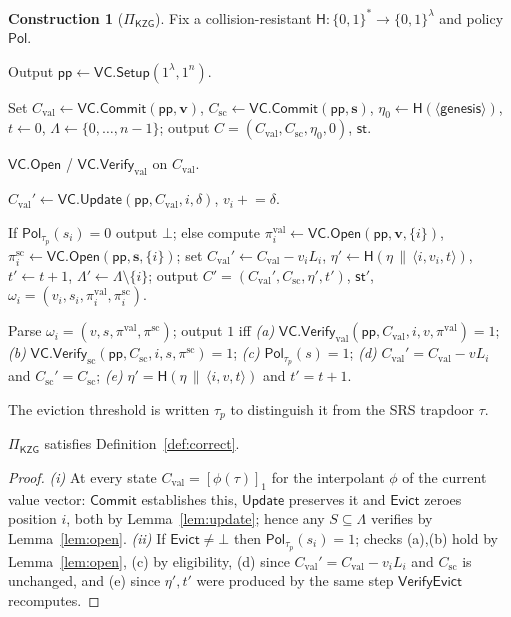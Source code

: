 \documentclass[version=submission]{iacrcc}
\theoremstyle{definition}
\newtheorem{construction}{Construction}[section]
\newcommand{\secpar}{\lambda}
\newcommand{\bit}{\{0,1\}}
\newcommand{\concat}{\,\|\,}
\newcommand{\Setup}{\mathsf{Setup}}
\newcommand{\Commit}{\mathsf{Commit}}
\newcommand{\Open}{\mathsf{Open}}
\newcommand{\Vfy}{\mathsf{Verify}}
\newcommand{\Update}{\mathsf{Update}}
\newcommand{\Evict}{\mathsf{Evict}}
\newcommand{\VfyEvict}{\mathsf{VerifyEvict}}
\newcommand{\pp}{\mathsf{pp}}
\newcommand{\aux}{\mathsf{st}}
\newcommand{\Pol}{\mathsf{Pol}}
\newcommand{\Val}{\mathrm{val}}
\newcommand{\Sc}{\mathrm{sc}}
\newcommand{\Cval}{C_{\Val}}
\newcommand{\Csc}{C_{\Sc}}
\newcommand{\Live}{\Lambda}
\newcommand{\hash}{\mathsf{H}}
\newcommand{\VC}{\mathsf{VC}}
\newcommand{\gone}[1]{\left[#1\right]_{1}}
\begin{document}
\begin{construction}[$\Pi_{\mathsf{KZG}}$]\label{con:evictvc}
Fix a collision-resistant $\hash:\bit^{*}\to\bit^{\secpar}$ and policy $\Pol$.
\begin{description}[leftmargin=0em,itemsep=4pt]
\item[$\Setup(1^\secpar,1^{n})$.] Output $\pp\leftarrow\VC.\Setup(1^\secpar,1^{n})$.
\item[$\Commit(\pp,\mathbf{v},\mathbf{s})$.] Set
      $\Cval\leftarrow\VC.\Commit(\pp,\mathbf{v})$,
      $\Csc\leftarrow\VC.\Commit(\pp,\mathbf{s})$,
      $\eta_0\leftarrow\hash(\langle\textsf{genesis}\rangle)$, $t\leftarrow0$,
      $\Live\leftarrow\{0,\dots,n-1\}$; output $C=(\Cval,\Csc,\eta_0,0)$, $\aux$.
\item[$\Open/\Vfy$.] $\VC.\Open$ / $\VC.\Vfy_{\Val}$ on $\Cval$.
\item[$\Update(\pp,\aux,i,\delta)$.]
      $\Cval'\leftarrow\VC.\Update(\pp,\Cval,i,\delta)$, $v_i\mathrel{+}=\delta$.
\item[$\Evict(\pp,\aux,i,\tau_{\!p})$.] If $\Pol_{\tau_{\!p}}(s_i)=0$ output
      $\bot$; else compute $\pi_i^{\Val}\leftarrow\VC.\Open(\pp,\mathbf{v},\{i\})$,
      $\pi_i^{\Sc}\leftarrow\VC.\Open(\pp,\mathbf{s},\{i\})$; set
      $\Cval'\leftarrow\Cval-v_i L_i$,
      $\eta'\leftarrow\hash(\eta\concat\langle i,v_i,t\rangle)$, $t'\leftarrow t+1$,
      $\Live'\leftarrow\Live\setminus\{i\}$; output $C'=(\Cval',\Csc,\eta',t')$,
      $\aux'$, $\omega_i=(v_i,s_i,\pi_i^{\Val},\pi_i^{\Sc})$.
\item[$\VfyEvict(\pp,C,i,\tau_{\!p},\omega_i,C')$.] Parse
      $\omega_i=(v,s,\pi^{\Val},\pi^{\Sc})$; output $1$ iff
      \emph{(a)} $\VC.\Vfy_{\Val}(\pp,\Cval,i,v,\pi^{\Val})=1$;
      \emph{(b)} $\VC.\Vfy_{\Sc}(\pp,\Csc,i,s,\pi^{\Sc})=1$;
      \emph{(c)} $\Pol_{\tau_{\!p}}(s)=1$;
      \emph{(d)} $\Cval'=\Cval-v L_i$ and $\Csc'=\Csc$;
      \emph{(e)} $\eta'=\hash(\eta\concat\langle i,v,t\rangle)$ and $t'=t+1$.
\end{description}
\end{construction}

\noindent The eviction threshold is written $\tau_{\!p}$ to distinguish it from
the SRS trapdoor $\tau$.

\begin{theorem}[Correctness]\label{thm:correct}
$\Pi_{\mathsf{KZG}}$ satisfies Definition~\ref{def:correct}.
\end{theorem}
\begin{proof}
\emph{(i)} At every state $\Cval=\gone{\phi(\tau)}$ for the interpolant $\phi$ of
the current value vector: $\Commit$ establishes this, $\Update$ preserves it and
$\Evict$ zeroes position $i$, both by Lemma~\ref{lem:update}; hence any
$S\subseteq\Live$ verifies by Lemma~\ref{lem:open}. \emph{(ii)} If
$\Evict\neq\bot$ then $\Pol_{\tau_{\!p}}(s_i)=1$; checks (a),(b) hold by
Lemma~\ref{lem:open}, (c) by eligibility, (d) since $\Cval'=\Cval-v_iL_i$ and
$\Csc$ is unchanged, and (e) since $\eta',t'$ were produced by the same step
$\VfyEvict$ recomputes.
\end{proof}
\end{document}
